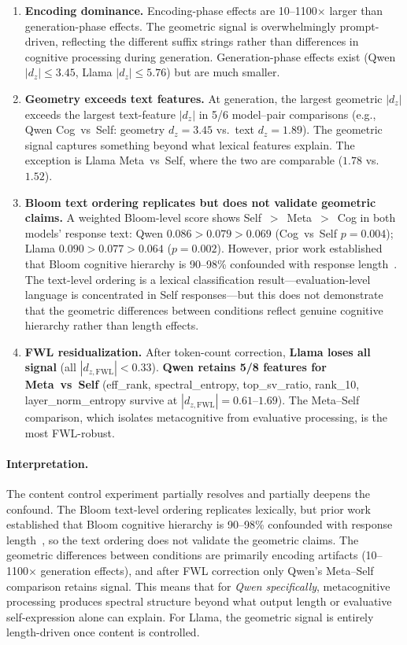 \documentclass[11pt,a4paper]{article}
\begin{document}
\begin{enumerate}[nosep]
    \item \textbf{Encoding dominance.} Encoding-phase effects are 10--1100$\times$ larger than generation-phase effects. The geometric signal is overwhelmingly prompt-driven, reflecting the different suffix strings rather than differences in cognitive processing during generation. Generation-phase effects exist (Qwen $|d_z| \leq 3.45$, Llama $|d_z| \leq 5.76$) but are much smaller.

    \item \textbf{Geometry exceeds text features.} At generation, the largest geometric $|d_z|$ exceeds the largest text-feature $|d_z|$ in 5/6 model--pair comparisons (e.g., Qwen Cog~vs~Self: geometry $d_z = 3.45$ vs.\ text $d_z = 1.89$). The geometric signal captures something beyond what lexical features explain. The exception is Llama Meta~vs~Self, where the two are comparable ($1.78$ vs.\ $1.52$).

    \item \textbf{Bloom text ordering replicates but does not validate geometric claims.} A weighted Bloom-level score shows Self~$>$~Meta~$>$~Cog in both models' response text: Qwen $0.086 > 0.079 > 0.069$ (Cog~vs~Self $p = 0.004$); Llama $0.090 > 0.077 > 0.064$ ($p = 0.002$). However, prior work established that Bloom cognitive hierarchy is 90--98\% confounded with response length~\citep{lyra2026campaign3}. The text-level ordering is a lexical classification result---evaluation-level language is concentrated in Self responses---but this does not demonstrate that the geometric differences between conditions reflect genuine cognitive hierarchy rather than length effects.

    \item \textbf{FWL residualization.} After token-count correction, \textbf{Llama loses all signal} (all $|d_{z,\text{FWL}}| < 0.33$). \textbf{Qwen retains 5/8 features for Meta~vs~Self} (eff\_rank, spectral\_entropy, top\_sv\_ratio, rank\_10, layer\_norm\_entropy survive at $|d_{z,\text{FWL}}| = 0.61$--$1.69$). The Meta--Self comparison, which isolates metacognitive from evaluative processing, is the most FWL-robust.
\end{enumerate}

\paragraph{Interpretation.}
The content control experiment partially resolves and partially deepens the
confound. The Bloom text-level ordering replicates lexically, but prior work
established that Bloom cognitive hierarchy is 90--98\% confounded with
response length~\citep{lyra2026campaign3}, so the text ordering does not
validate the geometric claims. The geometric differences between conditions
are primarily encoding artifacts (10--1100$\times$ generation effects), and
after FWL correction only Qwen's Meta--Self comparison retains signal. This
means that for \emph{Qwen specifically}, metacognitive processing produces
spectral structure beyond what output length or evaluative self-expression
alone can explain. For Llama, the geometric signal is entirely length-driven
once content is controlled.
\end{document}
